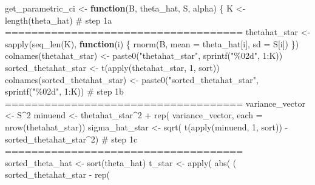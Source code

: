 \documentclass[
  12pt,
  a4paper,
]{article}
\newenvironment{Shaded}{\begin{snugshade}}{\end{snugshade}}
\newcommand{\AttributeTok}[1]{\textcolor[rgb]{0.00,0.34,0.68}{#1}}
\newcommand{\CommentTok}[1]{\textcolor[rgb]{0.54,0.53,0.53}{#1}}
\newcommand{\ControlFlowTok}[1]{\textcolor[rgb]{0.12,0.11,0.11}{\textbf{#1}}}
\newcommand{\DecValTok}[1]{\textcolor[rgb]{0.69,0.50,0.00}{#1}}
\newcommand{\FunctionTok}[1]{\textcolor[rgb]{0.39,0.29,0.61}{#1}}
\newcommand{\NormalTok}[1]{\textcolor[rgb]{0.12,0.11,0.11}{#1}}
\newcommand{\OtherTok}[1]{\textcolor[rgb]{0.00,0.43,0.16}{#1}}
\newcommand{\SpecialCharTok}[1]{\textcolor[rgb]{0.24,0.68,0.91}{#1}}
\newcommand{\StringTok}[1]{\textcolor[rgb]{0.75,0.01,0.01}{#1}}
\numberwithin{equation}{section}
\begin{document}
\begin{Shaded}
\begin{Highlighting}[]
\NormalTok{get\_parametric\_ci }\OtherTok{\textless{}{-}} \ControlFlowTok{function}\NormalTok{(B,}
\NormalTok{                              theta\_hat,}
\NormalTok{                              S,}
\NormalTok{                              alpha) \{}
\NormalTok{  K }\OtherTok{\textless{}{-}} \FunctionTok{length}\NormalTok{(theta\_hat)}
  \CommentTok{\# step 1a ====================================}
\NormalTok{  thetahat\_star }\OtherTok{\textless{}{-}} \FunctionTok{sapply}\NormalTok{(}\FunctionTok{seq\_len}\NormalTok{(K), }\ControlFlowTok{function}\NormalTok{(i) \{}
    \FunctionTok{rnorm}\NormalTok{(B, }\AttributeTok{mean =}\NormalTok{ theta\_hat[i], }\AttributeTok{sd =}\NormalTok{ S[i])}
\NormalTok{  \})}
  \FunctionTok{colnames}\NormalTok{(thetahat\_star) }\OtherTok{\textless{}{-}} \FunctionTok{paste0}\NormalTok{(}\StringTok{"thetahat\_star"}\NormalTok{, }
                                    \FunctionTok{sprintf}\NormalTok{(}\StringTok{"\%02d"}\NormalTok{, }\DecValTok{1}\SpecialCharTok{:}\NormalTok{K))}
\NormalTok{  sorted\_thetahat\_star }\OtherTok{\textless{}{-}} \FunctionTok{t}\NormalTok{(}\FunctionTok{apply}\NormalTok{(thetahat\_star, }\DecValTok{1}\NormalTok{, sort))}
  \FunctionTok{colnames}\NormalTok{(sorted\_thetahat\_star) }\OtherTok{\textless{}{-}} \FunctionTok{paste0}\NormalTok{(}\StringTok{"sorted\_thetahat\_star"}\NormalTok{, }
                                           \FunctionTok{sprintf}\NormalTok{(}\StringTok{"\%02d"}\NormalTok{, }\DecValTok{1}\SpecialCharTok{:}\NormalTok{K))}
  \CommentTok{\# step 1b ====================================}
\NormalTok{  variance\_vector }\OtherTok{\textless{}{-}}\NormalTok{ S}\SpecialCharTok{\^{}}\DecValTok{2}
\NormalTok{  minuend }\OtherTok{\textless{}{-}}\NormalTok{ thetahat\_star}\SpecialCharTok{\^{}}\DecValTok{2} \SpecialCharTok{+} \FunctionTok{rep}\NormalTok{(}
\NormalTok{    variance\_vector, }\AttributeTok{each =} \FunctionTok{nrow}\NormalTok{(thetahat\_star))}
\NormalTok{  sigma\_hat\_star }\OtherTok{\textless{}{-}} \FunctionTok{sqrt}\NormalTok{(}
    \FunctionTok{t}\NormalTok{(}\FunctionTok{apply}\NormalTok{(minuend, }\DecValTok{1}\NormalTok{, sort)) }\SpecialCharTok{{-}}\NormalTok{ sorted\_thetahat\_star}\SpecialCharTok{\^{}}\DecValTok{2}\NormalTok{)}
  \CommentTok{\# step 1c ====================================}
\NormalTok{  sorted\_theta\_hat }\OtherTok{\textless{}{-}} \FunctionTok{sort}\NormalTok{(theta\_hat)}
\NormalTok{  t\_star }\OtherTok{\textless{}{-}} \FunctionTok{apply}\NormalTok{(}
    \FunctionTok{abs}\NormalTok{(}
\NormalTok{      (}
\NormalTok{        sorted\_thetahat\_star }\SpecialCharTok{{-}} \FunctionTok{rep}\NormalTok{(}

\end{Highlighting}
\end{Shaded}
\end{document}
